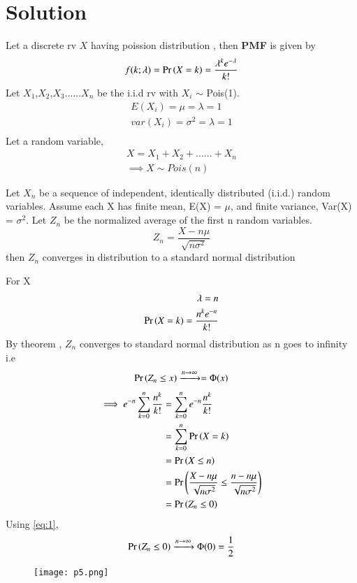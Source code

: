 \documentclass[journal,12pt,twocolumn]{IEEEtran}
\begin{document}
\section{Solution}
Let a discrete rv $X$ having poission distribution , then \textbf{PMF} is given by
\begin{align}
    f(k;\lambda) = \Pr\left(X = k\right) = \frac{\lambda^k e^{-\lambda}}{k!}
\end{align}
Let $X_1$,$X_2$,$X_3$......$X_n$ be the i.i.d rv  with $X_i$ $\sim$ Pois(1). 
\begin{align}
    E(X_i) = \mu = \lambda = 1\\
    var(X_i) = \sigma^2 = \lambda = 1\\
\end{align}
Let a random variable,
\begin{align}
    X = X_1 + X_2 + ...... + X_n\\
\implies X \sim Pois(n) 
\end{align}
\begin{theorem}
Let $X_n$ be a sequence of independent, identically distributed (i.i.d.) random variables. Assume each X has finite mean, E(X) = $\mu$, and finite variance, Var(X) = $\sigma^2$. Let $Z_n$ be the normalized average of the first n random variables.
\begin{equation}
     Z_n = \frac{X - n \mu}{\sqrt{n \sigma^2}}
\end{equation}
 then $Z_n$ converges in distribution to a standard normal distribution
\end{theorem}
For X 
\begin{align}
    \lambda = n \\
    \Pr\left(X = k\right) = \frac{n^k e^{-n}}{k!}
\end{align}
By theorem , $Z_n$ converges to standard normal distribution as n goes to infinity i.e
\begin{align}
    \Pr\left(Z_n \leq x\right) \xrightarrow{ n \rightarrow \infty} = \Phi(x) \label{eq:1}
\end{align}
\begin{align}
\implies e^{-n} \sum_{k=0}^{n} \frac{n^k}{k!} & = \sum_{k = 0}^{n} e^{-n}  \frac{n^k}{k!} \\
& = \sum_{k = 0}^{n} \Pr\left(X=k\right) \\
& = \Pr\left(X \leq n\right) \\
& = \Pr\left( \frac{X - n \mu}{\sqrt{n \sigma^2}} \leq \frac{n - n \mu}{\sqrt{n \sigma^2}}\right) \\
& = \Pr\left(Z_n \leq 0\right)
\end{align}
Using \eqref{eq:1},
\begin{align}
\Pr\left( Z_n \leq 0\right) \xrightarrow{n \rightarrow \infty} \Phi(0)
 = \frac{1}{2}
\end{align}
\begin{figure}
    \texttt{[image: p5.png]}
    \label{fig:1}
\end{figure}
\end{document}
